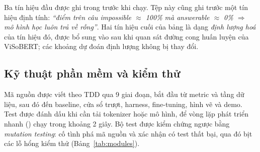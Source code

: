 \noindent Ba tín hiệu đầu được ghi trong  trước khi chạy. Tệp này cũng ghi
trước một tín hiệu định tính: \emph{``điểm trên câu impossible $\approx$ 100\% mà answerable
$\approx$ 0\% $\Rightarrow$ mô hình học luôn trả về rỗng''}. Hai tín hiệu cuối của bảng là dạng
\emph{định lượng hoá} của tín hiệu đó, được bổ sung vào  sau khi quan
sát đường cong huấn luyện của ViSoBERT; các khoảng dự đoán định lượng không bị thay đổi.

\subsection{Kỹ thuật phần mềm và kiểm thử}
\label{sec:testing}

Mã nguồn được viết theo TDD qua 9 giai đoạn, bắt đầu từ metric và tầng dữ liệu, sau đó
đến baseline, cửa sổ trượt, harness, fine-tuning, hình vẽ và demo. Test được đánh dấu
 khi cần tải tokenizer hoặc mô hình, để vòng lặp phát triển nhanh
() chạy trong khoảng 2 giây. Bộ test được kiểm chứng ngược bằng
\emph{mutation testing}: cố tình phá mã nguồn và xác nhận có test thất bại, qua đó bịt các
lỗ hổng kiểm thử (Bảng~\ref{tab:modules}).

